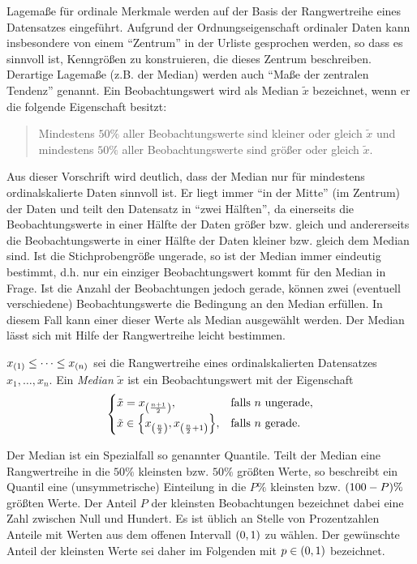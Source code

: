 \documentclass{lecture}
\begin{document}
    Lagemaße für ordinale Merkmale werden auf der Basis der Rangwertreihe eines Datensatzes eingeführt.
    Aufgrund der Ordnungseigenschaft ordinaler Daten kann insbesondere von einem ``Zentrum'' in der Urliste gesprochen werden, so dass es sinnvoll ist, Kenngrößen zu konstruieren, die dieses Zentrum beschreiben.
    Derartige Lagemaße (z.B. der Median) werden auch ``Maße der zentralen Tendenz'' genannt.
    Ein Beobachtungswert wird als Median \(\tilde{x}\) bezeichnet, wenn er die folgende Eigenschaft besitzt:
    \begin{quote}
        Mindestens \(50\%\) aller Beobachtungswerte sind kleiner oder gleich \(\tilde{x}\) und mindestens \(50\%\) aller Beobachtungswerte sind größer oder gleich \(\tilde{x}\).
    \end{quote}
    Aus dieser Vorschrift wird deutlich, dass der Median nur für mindestens ordinalskalierte Daten sinnvoll ist.
    Er liegt immer ``in der Mitte'' (im Zentrum) der Daten und teilt den Datensatz in ``zwei Hälften'', da einerseits die Beobachtungswerte in einer Hälfte der Daten größer bzw. gleich und andererseits die Beobachtungswerte in einer Hälfte der Daten kleiner bzw. gleich dem Median sind.
    Ist die Stichprobengröße ungerade, so ist der Median immer eindeutig bestimmt, d.h. nur ein einziger Beobachtungswert kommt für den Median in Frage.
    Ist die Anzahl der Beobachtungen jedoch gerade, können zwei (eventuell verschiedene) Beobachtungswerte die Bedingung an den Median erfüllen.
    In diesem Fall kann einer dieser Werte als Median ausgewählt werden.
    Der Median lässt sich mit Hilfe der Rangwertreihe leicht bestimmen.

    \begin{definition}
        \(x_{\parentheses*{1}} \le \cdots \le x_{\parentheses*{n}}\) sei die Rangwertreihe eines ordinalskalierten Datensatzes \(x_1, \ldots, x_n\).
        Ein \emph{Median} \(\tilde{x}\) ist ein Beobachtungswert mit der Eigenschaft
        \[
            \begin{cases}
                \tilde{x} = x_{\parentheses*{\frac{n + 1}{2}}}, & \text{falls }n\text{ ungerade},\\
                \tilde{x} \in \braces*{x_{\parentheses*{\frac{n}{2}}}, x_{\parentheses*{\frac{n}{2} + 1}}}, & \text{falls }n\text{ gerade}.
            \end{cases}
        \]
    \end{definition}

    Der Median ist ein Spezialfall so genannter Quantile.
    Teilt der Median eine Rangwertreihe in die \(50\%\) kleinsten bzw. \(50\%\) größten Werte, so beschreibt ein Quantil eine (unsymmetrische) Einteilung in die \(P\%\) kleinsten bzw. \(\parentheses*{100 - P}\%\) größten Werte.
    Der Anteil \(P\) der kleinsten Beobachtungen bezeichnet dabei eine Zahl zwischen Null und Hundert.
    Es ist üblich an Stelle von Prozentzahlen Anteile mit Werten aus dem offenen Intervall \(\parentheses*{0, 1}\) zu wählen.
    Der gewünschte Anteil der kleinsten Werte sei daher im Folgenden mit \(p \in \parentheses*{0, 1}\) bezeichnet.
    
\end{document}
